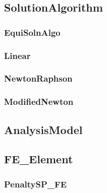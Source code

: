 \documentclass[12pt]{article}
\begin{document}
\pagebreak \subsection{{\bf SolutionAlgorithm}}


\pagebreak \subsubsection{{\bf EquiSolnAlgo}}


\pagebreak \subsubsection{Linear}


\pagebreak \subsubsection{NewtonRaphson}


\pagebreak \subsubsection{ModifiedNewton}


%

\pagebreak \subsection{AnalysisModel}


\pagebreak \subsection{FE\_Element}


\pagebreak \subsubsection{PenaltySP\_FE}

\end{document}
